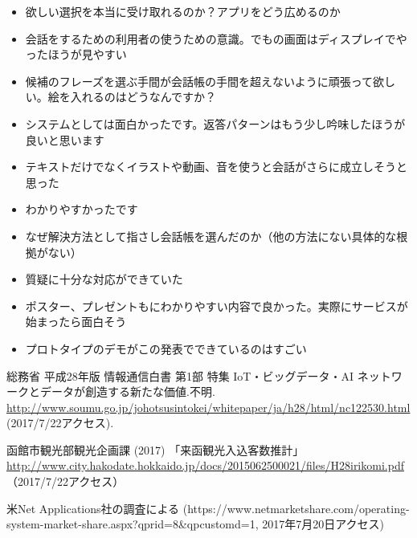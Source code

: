 \documentclass[openany,11pt,papersize]{jsbook}
\begin{document}
\begin{appendix}
\begin{itemize}
 \item 欲しい選択を本当に受け取れるのか？アプリをどう広めるのか
 \item 会話をするための利用者の使うための意識。でもの画面はディスプレイでやったほうが見やすい
 \item 候補のフレーズを選ぶ手間が会話帳の手間を超えないように頑張って欲しい。絵を入れるのはどうなんですか？
 \item システムとしては面白かったです。返答パターンはもう少し吟味したほうが良いと思います
 \item テキストだけでなくイラストや動画、音を使うと会話がさらに成立しそうと思った
 \item わかりやすかったです
 \item なぜ解決方法として指さし会話帳を選んだのか（他の方法にない具体的な根拠がない）
 \item 質疑に十分な対応ができていた
 \item ポスター、プレゼントもにわかりやすい内容で良かった。実際にサービスが始まったら面白そう
 \item プロトタイプのデモがこの発表でできているのはすごい

\end{itemize}
\end{appendix}



\begin{thebibliography}{9}
 総務省 平成28年版 情報通信白書 第1部 特集 IoT・ビッグデータ・AI
ネットワークとデータが創造する新たな価値.不明.
\url{http://www.soumu.go.jp/johotsusintokei/whitepaper/ja/h28/html/nc122530.html} (2017/7/22アクセス).

 函館市観光部観光企画課 (2017) 「来函観光入込客数推計」
\url{http://www.city.hakodate.hokkaido.jp/docs/2015062500021/files/H28irikomi.pdf}
（2017/7/22アクセス）

 米Net Applications社の調査による
(https://www.netmarketshare.com/operating-system-market-share.aspx?qprid=8\&qpcustomd=1, 2017年7月20日アクセス)
\end{thebibliography}
\end{document}
